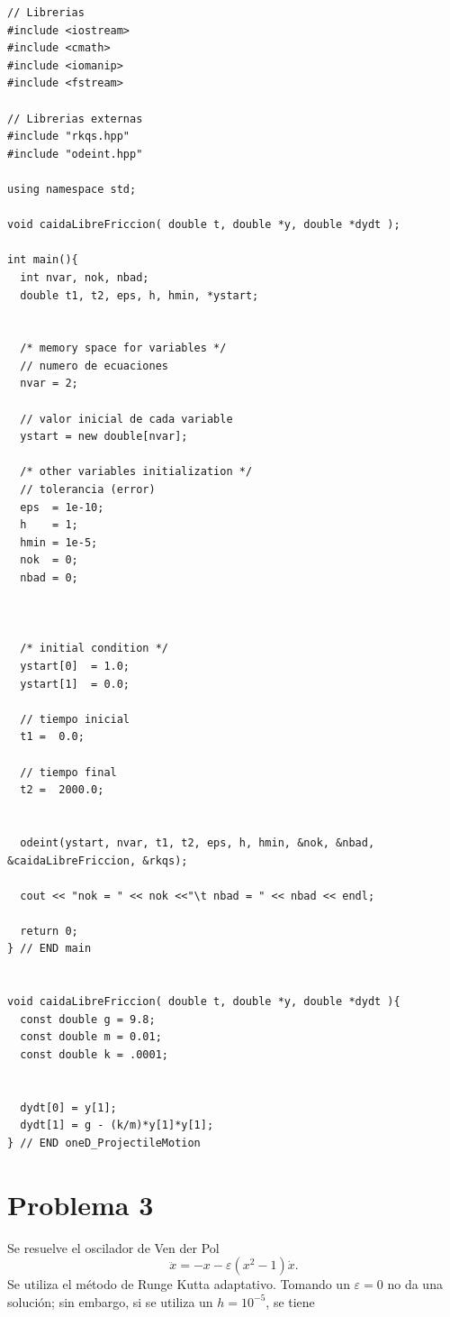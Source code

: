 \begin{lstlisting}
// Librerias
#include <iostream>
#include <cmath>
#include <iomanip>
#include <fstream>

// Librerias externas
#include "rkqs.hpp"
#include "odeint.hpp"

using namespace std;

void caidaLibreFriccion( double t, double *y, double *dydt );

int main(){
  int nvar, nok, nbad;
  double t1, t2, eps, h, hmin, *ystart;


  /* memory space for variables */
  // numero de ecuaciones
  nvar = 2;

  // valor inicial de cada variable
  ystart = new double[nvar];

  /* other variables initialization */
  // tolerancia (error)
  eps  = 1e-10;
  h    = 1;
  hmin = 1e-5;
  nok  = 0;
  nbad = 0;



  /* initial condition */
  ystart[0]  = 1.0;
  ystart[1]  = 0.0;

  // tiempo inicial
  t1 =  0.0;

  // tiempo final
  t2 =  2000.0;


  odeint(ystart, nvar, t1, t2, eps, h, hmin, &nok, &nbad, &caidaLibreFriccion, &rkqs);

  cout << "nok = " << nok <<"\t nbad = " << nbad << endl;

  return 0;
} // END main


void caidaLibreFriccion( double t, double *y, double *dydt ){
  const double g = 9.8;
  const double m = 0.01;
  const double k = .0001;


  dydt[0] = y[1];
  dydt[1] = g - (k/m)*y[1]*y[1];
} // END oneD_ProjectileMotion
\end{lstlisting}




\section*{Problema 3}
Se resuelve el oscilador de Ven der Pol
	$$ \ddot{x} = -x-\varepsilon (x^2 - 1) \dot{x}. $$
Se utiliza el método de Runge Kutta adaptativo. Tomando un $\varepsilon = 0$ no da una solución; sin embargo, si se utiliza un $h = 10^{-5}$, se tiene


